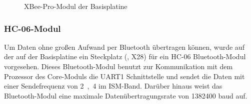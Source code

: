 \begin{figure}[htb]
    \centering
    \qquad
    \qquad
    \caption[XBee-Pro-Modul der Basisplatine]{XBee-Pro-Modul der \gls{Basisplatine}}
    \label{fig:basisplatine-xbee}
\end{figure}

\subsubsection{HC-06-Modul \cite{basis:hc06}}
Um Daten ohne großen Aufwand per Bluetooth übertragen können, wurde auf der auf der \gls{Basisplatine} ein Steckplatz (, X28) für ein HC-06 Bluetooth-Modul vorgesehen. Dieses Bluetooth-Modul benutzt zur Kommunikation mit dem Prozessor des \gls{Core-Modul}s die UART1 Schnittstelle und sendet die Daten mit einer Sendefrequenz von \unit{2,4}{\giga\hertz} im ISM-Band. Darüber hinaus weist das Bluetooth-Modul eine maximale Datenübertragungsrate von 1382400 baud auf.

